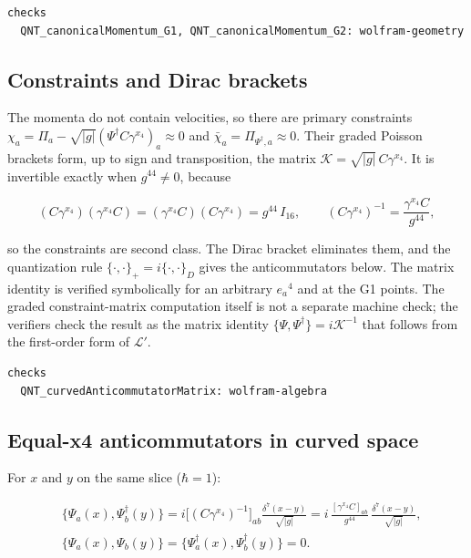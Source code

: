 \documentclass[11pt]{article}
\begin{document}
\begin{Verbatim}[fontsize=\small]
checks
  QNT_canonicalMomentum_G1, QNT_canonicalMomentum_G2: wolfram-geometry
\end{Verbatim}

\subsection{Constraints and Dirac brackets}

The momenta do not contain velocities, so there are primary constraints $\chi_a=\Pi_a-\sqrt{|g|}(\Psi^\dagger C\gamma^{x_4})_a\approx0$ and $\bar\chi_a=\Pi_{\Psi^\dagger,a}\approx0$. Their graded Poisson brackets form, up to sign and transposition, the matrix $\mathcal K=\sqrt{|g|}\,C\gamma^{x_4}$. It is invertible exactly when $g^{44}\ne0$, because

\[
(C\gamma^{x_4})(\gamma^{x_4}C)=(\gamma^{x_4}C)(C\gamma^{x_4})=g^{44}\,I_{16},\qquad (C\gamma^{x_4})^{-1}=\frac{\gamma^{x_4}C}{g^{44}},
\]

so the constraints are second class. The Dirac bracket eliminates them, and the quantization rule $\{\cdot,\cdot\}_+=i\{\cdot,\cdot\}_D$ gives the anticommutators below. The matrix identity is verified symbolically for an arbitrary $e_a{}^4$ and at the G1 points. The graded constraint-matrix computation itself is not a separate machine check; the verifiers check the result as the matrix identity $\{\Psi,\Psi^\dagger\}=i\mathcal K^{-1}$ that follows from the first-order form of $\mathcal L'$.

\begin{Verbatim}[fontsize=\small]
checks
  QNT_curvedAnticommutatorMatrix: wolfram-algebra
\end{Verbatim}

\subsection{Equal-x4 anticommutators in curved space}

For $x$ and $y$ on the same slice ($\hbar=1$):

\[
\begin{aligned}
&\bigl\{\Psi_a(x),\Psi^\dagger_b(y)\bigr\}=i\bigl[(C\gamma^{x_4})^{-1}\bigr]_{ab}\frac{\delta^7(x-y)}{\sqrt{|g|}}=i\,\frac{[\gamma^{x_4}C]_{ab}}{g^{44}}\,\frac{\delta^7(x-y)}{\sqrt{|g|}},\\
&\{\Psi_a(x),\Psi_b(y)\}=\{\Psi^\dagger_a(x),\Psi^\dagger_b(y)\}=0 .
\end{aligned}
\]
\end{document}
